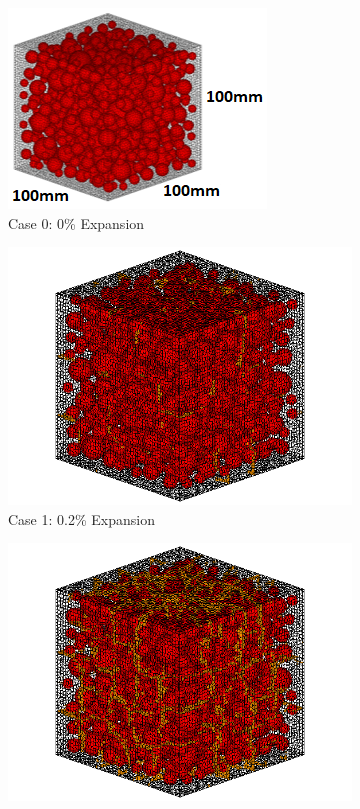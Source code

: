 \begin{figure}[ht!]
\centering

    \begin{subfigure}{.5\textwidth}
      \centering
      \includegraphics[width=.6\linewidth]{Files/Aggregate/A30.png} %
    \caption{Case 0: 0\% Expansion}
    \end{subfigure}%
    \begin{subfigure}{.5\textwidth}
      \centering
      \includegraphics[width=.8\linewidth]{Files/exp_3D/DEF/A30X-1C_1_c.png}
    \caption{Case 1: 0.2\% Expansion}
    \end{subfigure}
    \begin{subfigure}{.5\textwidth}
      \centering
      \includegraphics[width=.8\linewidth]{Files/exp_3D/DEF/A30X-1C_2_c.png}

\end{subfigure}
\end{figure}
